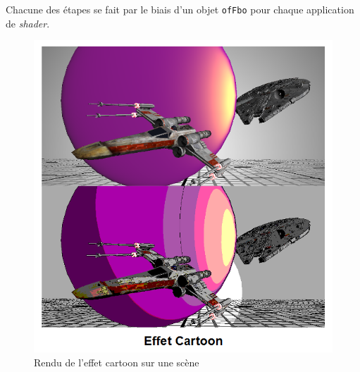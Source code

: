 Chacune des étapes se fait par le biais d'un objet \texttt{ofFbo} pour chaque application de \textit{shader}.


\begin{figure}[H]
    \centering
	\includegraphics[scale=1]{img/infog-image-effet-cartoon.png}
	\caption{Rendu de l'effet cartoon sur une scène}
	\label{fig:cartooneffect}
\end{figure}